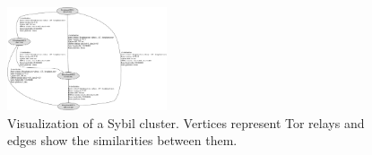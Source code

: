 \begin{figure}[t]
	\centering
	\includegraphics[width=0.42\textwidth]{diagrams/visualization.pdf}
    \caption{Visualization of a Sybil cluster.  Vertices represent Tor relays
    and edges show the similarities between them.}
	\label{fig:visualization}
\end{figure}
